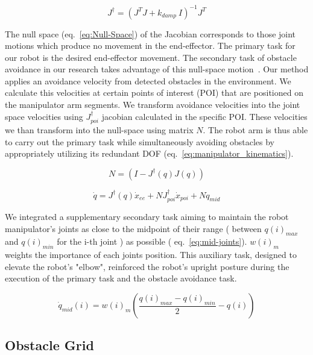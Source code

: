\documentclass[a4paper]{article}
\begin{document}
\begin{equation}   	
	J^{\dagger} = (J^{T}J + k_{damp} ~I)^{-1}J^{T}
	\label{eq:moore_penrose}
\end{equation}

The null space (eq.~\ref{eq:Null-Space}) of the Jacobian corresponds to those joint motions which produce no movement in the end-effector. The primary task for our robot is the desired end-effector movement. The secondary task of obstacle avoidance in our research takes advantage of this null-space motion~\cite{lajpah_Petri_2012}. Our method applies an avoidance velocity from detected obstacles in the environment. We calculate this velocities at certain points of interest (POI) that are positioned on the manipulator arm segments. We transform avoidance velocities into the joint space velocities using $J^{\dagger}_{poi}$ jacobian calculated in the specific POI. These velocities we than transform into the null-space using matrix $N$. The robot arm is thus able to carry out the primary task while simultaneously avoiding obstacles by appropriately utilizing its redundant DOF (eq.~\ref{eq:manipulator_kinematics}). 

\begin{equation}
	N = (I - J^{\dagger}(q)J(q))
	\label{eq:Null-Space}
\end{equation}

\begin{equation}
	\dot{q} = J^{\dagger}(q) \dot{x}_{ee} + N J^{\dagger}_{poi} \dot{x}_{poi} + N \dot{q}_{mid}
	\label{eq:manipulator_kinematics}
\end{equation}


We integrated a supplementary secondary task aiming to maintain the robot manipulator's joints as close to the midpoint of their range ( between $q(i)_{max}$ and $q(i)_{min}$ for the i-th joint ) as possible ( eq.~\ref{eq:mid-joints}). $w(i)_m$ weights the importance of each joints position. This auxiliary task, designed to elevate the robot's "elbow", reinforced the robot's upright posture during the execution of the primary task and the obstacle avoidance task.

\begin{equation}
	\dot{q}_{mid}(i) = w(i)_m \left( \frac{q(i)_{max}-q(i)_{min}}{2} - q(i)\right) 
	\label{eq:mid-joints}
\end{equation}

\subsection{Obstacle Grid}
\end{document}
